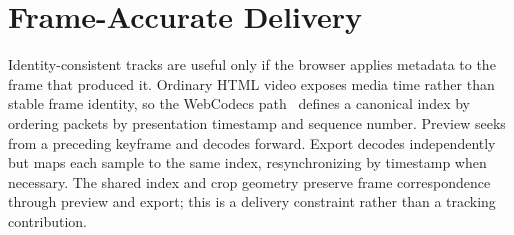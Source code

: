 \section{Frame-Accurate Delivery}
\label{sec:player}

Identity-consistent tracks are useful only if the browser applies metadata to the
frame that produced it. Ordinary HTML video exposes media time rather than stable
frame identity, so the WebCodecs path~\cite{webcodecs} defines a canonical index by
ordering packets by presentation timestamp and sequence number. Preview seeks from a
preceding keyframe and decodes forward. Export decodes independently but maps each
sample to the same index, resynchronizing by timestamp when necessary. The shared
index and crop geometry preserve frame correspondence through preview and export;
this is a delivery constraint rather than a tracking contribution.
